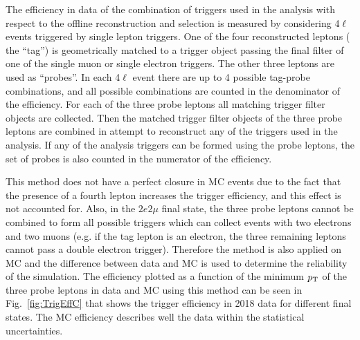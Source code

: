 The efficiency in data of the combination of triggers used in the analysis with respect to the offline reconstruction and selection is measured
by considering 4$\ell$ events triggered by single lepton triggers. One of the four reconstructed leptons ( the ``tag'') is geometrically matched 
to a trigger object passing the final filter of one of the single muon or single electron triggers. The other three leptons are 
used as ``probes''. In each 4$\ell$ event there are up to 4 possible tag-probe combinations, and all possible combinations are counted in the
denominator of the efficiency. For each of the three probe leptons all matching trigger filter objects are collected. Then the matched trigger filter
objects of the three probe leptons are combined in attempt to reconstruct any of the triggers used in the analysis. If any of the analysis triggers
can be formed using the probe leptons, the set of probes is also counted in the numerator of the efficiency.

This method does not have a perfect closure in MC events due to the fact that the presence of a fourth lepton increases the trigger efficiency,
and this effect is not accounted for. Also, in the  $2e2\mu$ final state, the three probe leptons cannot be combined to form all possible triggers which 
can collect events with two electrons and two muons (e.g. if the tag lepton is an electron, the three remaining leptons cannot pass a double electron
trigger). Therefore the method is also applied on MC and the difference between data and MC is used to determine the reliability of the simulation.
 The efficiency plotted as a function of the minimum $p_{\rm{T}}$ of the three probe leptons in data and MC using this method can be seen in 
Fig.~\ref{fig:TrigEffC} that shows the trigger efficiency in 2018 data for different final states. The MC efficiency describes well the data within the statistical uncertainties.


